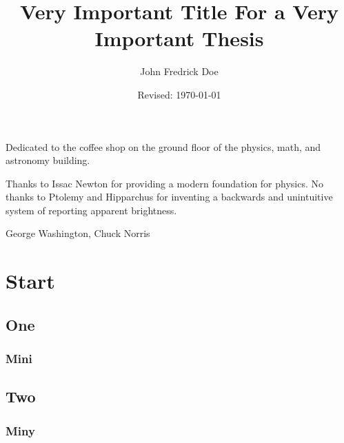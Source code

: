 \documentclass{utthesis}
\begin{document}
\author{John Fredrick Doe} 
\title{Very Important Title For a Very Important Thesis} 
\date{Revised: \today}

\UTcopyrightlegend %

\begin{UTcommittee}
\end{UTcommittee}


\frontmatter

\setcounter{page}{4}

\begin{UTdedication}
Dedicated to the coffee shop on the ground floor of the physics, math, and astronomy building.
\end{UTdedication}

\begin{UTacknowledgements}
Thanks to Issac Newton for providing a modern foundation for physics. No thanks to Ptolemy and Hipparchus for inventing a backwards and unintuitive system of reporting apparent brightness.
\end{UTacknowledgements}

\begin{UTabstract}[S]{George Washington, Chuck Norris}
\lipsum[1]
\end{UTabstract}


\tableofcontents

\listoftables

\listoffigures

\mainmatter

\chapter{Start}
\lipsum[3]
\section{One}
\subsection{Mini}
\section{Two}
\subsection{Miny}
\end{document}
